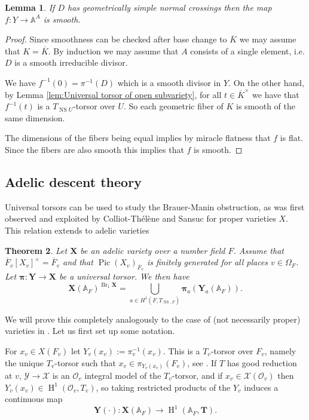 \documentclass[a4paper,11pt,reqno]{amsart}
\newcommand{\A}{\mathbb{A}}
\DeclareMathOperator{\Pic}{Pic}
\DeclareMathOperator{\NS}{NS}
\DeclareMathOperator{\Br}{Br}
\DeclareMathOperator{\HH}{H}
\newtheorem{theorem}{Theorem}[section]
\newtheorem{lemma}[theorem]{Lemma}
\theoremstyle{definition}
\begin{document}
	\begin{lemma}\label{lem:Divisor map smooths}
		If $D$ has geometrically simple normal crossings then the map $f:Y \to \A^A$ is smooth.
	\end{lemma}
	\begin{proof}
		Since smoothness can be checked after base change to $\overline{K}$ we may assume that $K = \overline{K}$. By induction we may assume that $A$ consists of a single element, i.e. $D$ is a smooth irreducible divisor.
		
		We have $f^{-1}(0) = \pi^{-1}(D)$ which is a smooth divisor in $Y$. On the other hand, by Lemma \ref{lem:Universal torsor of open subvariety}, for all $t \in \overline{K}^{\times}$ we have that $f^{-1}(t)$ is a $T_{\NS U}$-torsor over $U$. So each geometric fiber of $K$ is smooth of the same dimension. 
		
		The dimensions of the fibers being equal implies by miracle flatness that $f$ is flat. Since the fibers are also smooth this implies that $f$ is smooth.
	\end{proof}
\subsection{Adelic descent theory}
Universal torsors can be used to study the Brauer-Manin obstruction, as was first observed and exploited by Colliot-Th\'el\`ene and Sansuc \cite{Colliot1987Descente} for proper varieties $X$. This relation extends to adelic varieties	
\begin{theorem}\label{thm:Descent theory for adelic varieties}
	Let $\mathbf{X}$ be an adelic variety over a number field $F$. Assume that $\overline{F}_v[X_v]^{\times} = \overline{F}_v$ and that $\Pic (X_{v})_{\overline{F}_v}$ is finitely generated for all places $v \in \Omega_F$. Let $\bm{\pi}: \mathbf{Y} \to \mathbf{X}$ be a universal torsor. We then have 
	\begin{equation*}
		\mathbf{X}(\A_F)^{\Br_1 \mathbf{X}} = \bigcup_{a \in H^1(F, T_{\NS, F})} \bm{\pi}_a(\mathbf{Y}_a(\A_F)).
	\end{equation*}
\end{theorem}
We will prove this completely analogously to the case of (not necessarily proper) varieties in \cite[\S 6.1]{Skorogobatov2001Torsors}. Let us first set up some notation.

For $x_v \in X(F_v)$ let $Y_v(x_v) := \pi_v^{-1}(x_v)$. This is a $T_v$-torsor over $F_v$, namely the unique $T_v$-torsor such that $x_v \in \pi_{Y_v(x_v)}(F_v)$, see \cite[p. 22]{Skorogobatov2001Torsors}. If $T$ has good reduction at $v$, $\mathcal{Y} \to \mathcal{X}$ is an $\mathcal{O}_v$ integral model of the $T_v$-torsor, and if $x_v \in \mathcal{X}(\mathcal{O}_v)$ then $Y_v(x_v) \in \HH^1(\mathcal{O}_v, T_v)$, so taking restricted products of the $Y_v$ induces a continuous map 
\begin{equation}\label{Map sending a point to the twist it lies on}
	\mathbf{Y}(\cdot): \mathbf{X}(\A_F) \to \HH^1(\A_F, \mathbf{T}).
\end{equation}
\end{document}

